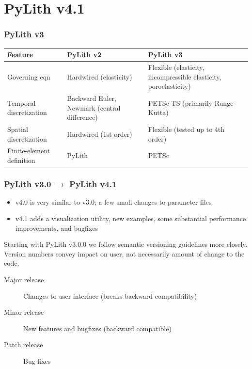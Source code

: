 \documentclass[aspectratio=169]{beamer}
\begin{document}
\section{PyLith v4.1}

\begin{frame}
  \frametitle{PyLith v3}

  \footnotesize{\begin{tabular}{p{3.0cm}p{5.0cm}p{5.0cm}}
    \toprule
    Feature
    & PyLith v2
    & PyLith v3 \\
    \midrule
    Governing eqn
    & Hardwired (elasticity)
    & Flexible (elasticity, incompressible elasticity, poroelasticity)
    \\[2em]
    Temporal discretization
    & Backward Euler, Newmark (central difference)
    & PETSc TS (primarily Runge Kutta)
      \\[2em]
    Spatial discretization
    & Hardwired (1st order)
    & Flexible (tested up to 4th order)
           \\[1em]
           Finite-element definition
           & PyLith
           & PETSc \\
    \bottomrule
  \end{tabular}}
    
\end{frame}


\begin{frame}
  \frametitle{PyLith v3.0 $\rightarrow$ PyLith v4.1}
  \summary{}

  \begin{itemize}
  \item v4.0 is very similar to v3.0; a few small changes to parameter files
  \item v4.1 adds a visualization utility, new examples, some substantial performance improvements, and bugfixes
  \end{itemize}

  \vfill\pause

  Starting with PyLith v3.0.0 we follow semantic versioning guidelines more closely.\\
  Version numbers convey impact on user, not necessarily amount of change to the code.

  \begin{description}
  \item[Major release] Changes to user interface (breaks backward compatibility)
  \item[Minor release] New features and bugfixes (backward compatible)
  \item[Patch release] Bug fixes
  \end{description}
    
\end{frame}
\end{document}
